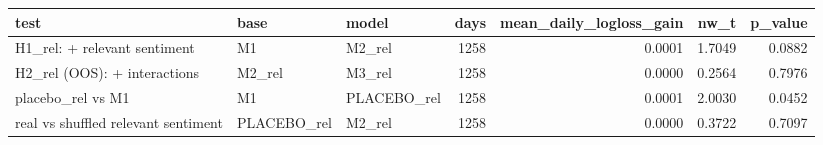 \begin{tabular}{lllrrrr}
\toprule
test & base & model & days & mean\_daily\_logloss\_gain & nw\_t & p\_value \\
\midrule
H1\_rel: + relevant sentiment & M1 & M2\_rel & 1258 & 0.0001 & 1.7049 & 0.0882 \\
H2\_rel (OOS): + interactions & M2\_rel & M3\_rel & 1258 & 0.0000 & 0.2564 & 0.7976 \\
placebo\_rel vs M1 & M1 & PLACEBO\_rel & 1258 & 0.0001 & 2.0030 & 0.0452 \\
real vs shuffled relevant sentiment & PLACEBO\_rel & M2\_rel & 1258 & 0.0000 & 0.3722 & 0.7097 \\
\bottomrule
\end{tabular}
